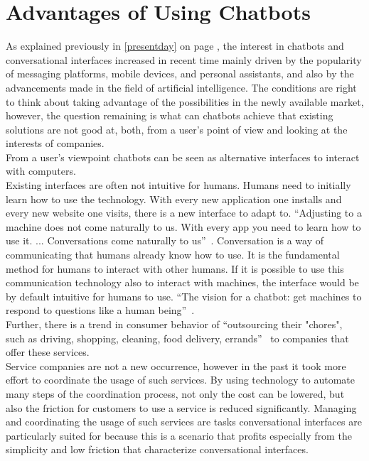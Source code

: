\section{Advantages of Using Chatbots}


As explained previously in \ref{presentday} on page \pageref{presentday}, the interest in chatbots and conversational interfaces increased in recent time mainly driven by the popularity of messaging platforms, mobile devices, and personal assistants, and also by the advancements made in the field of artificial intelligence.
The conditions are right to think about taking advantage of the possibilities in the newly available market, however, the question remaining is what can chatbots achieve that existing solutions are not good at, both, from a user's point of view and looking at the interests of companies.
\\

From a user's viewpoint chatbots can be seen as alternative interfaces to interact with computers.
\\
Existing interfaces are often not intuitive for humans.
Humans need to initially learn how to use the technology.
With every new application one installs and every new website one visits, there is a new interface to adapt to.
``Adjusting to a machine does not come naturally to us. With every app you need to learn how to use it. ... Conversations come naturally to us''~\cite{techinasia}.
Conversation is a way of communicating that humans already know how to use.
It is the fundamental method for humans to interact with other humans.
If it is possible to use this communication technology also to interact with machines, the interface would be by default intuitive for humans to use.
``The vision for a chatbot: get machines to respond to questions like a human being''~\cite{techinasia}.
\\

Further, there is a trend in consumer behavior of ``outsourcing their "chores", such as driving, shopping, cleaning, food delivery, errands''~\cite{chatbotbook} to companies that offer these services.
\\
Service companies are not a new occurrence, however in the past it took more effort to coordinate the usage of such services.
By using technology to automate many steps of the coordination process, not only the cost can be lowered,
but also the friction for customers to use a service is reduced significantly.
Managing and coordinating the usage of such services are tasks conversational interfaces are particularly suited for because this is a scenario that profits especially from the simplicity and low friction that characterize conversational interfaces.
\\

